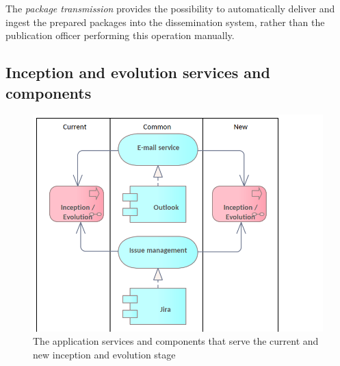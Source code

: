 	The \textit{package transmission} provides the possibility to automatically deliver and ingest the prepared packages into the dissemination system, rather than the publication officer performing this operation manually. 
	

	
	\subsection{Inception and evolution services and components}
	\label{sec:evolution-application}	
	\begin{figure}[h]
		\centering
		\includegraphics[width=.6\textwidth]{images/application/InceptionEvolution.png}
		\caption{The application services and components that serve the current and new inception and evolution stage}
		\label{fig:application-inception-evolution}
	\end{figure}

